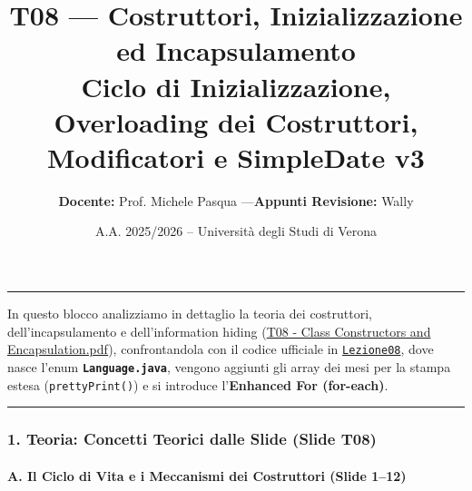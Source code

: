 \documentclass[11pt,a4paper]{article}
\title{\Huge\bfseries\sffamily\color{brandblue} T08 --- Costruttori, Inizializzazione ed Incapsulamento \\[0.3em] \large\sffamily Ciclo di Inizializzazione, Overloading dei Costruttori, Modificatori e SimpleDate v3}
\author{\textbf{Docente:} Prof. Michele Pasqua \quad---\quad \textbf{Appunti Revisione:} Wally}
\date{A.A. 2025/2026 -- Universit\`a degli Studi di Verona}
\newcommand{\passthrough}[1]{#1}
\begin{document}
\maketitle
\thispagestyle{fancy}
\vspace{-1.2em}
\noindent\textcolor{brandblue}{\rule{\textwidth}{0.8pt}}
\vspace{1.2em}

In questo blocco analizziamo in dettaglio la teoria dei costruttori,
dell'incapsulamento e dell'information hiding
(\href{file:///home/wally/Documenti/GitHub/Programmazione-II/25-26/Teoria-e-Esercitazioni/Slides-20260902/T08\%20-\%20Class\%20Constructors\%20and\%20Encapsulation.pdf}{T08
- Class Constructors and Encapsulation.pdf}), confrontandola con il
codice ufficiale in
\href{file:///home/wally/Documenti/GitHub/Programmazione-II/25-26/Teoria-e-Esercitazioni/Codice-20260902/Lezione08/SimpleDate/src}{\passthrough{\lstinline!Lezione08!}},
dove nasce l'enum \textbf{\passthrough{\lstinline!Language.java!}},
vengono aggiunti gli array dei mesi per la stampa estesa
(\passthrough{\lstinline!prettyPrint()!}) e si introduce
l'\textbf{Enhanced For (for-each)}.

\begin{center}\rule{0.5\linewidth}{0.5pt}\end{center}

\subsubsection{1. Teoria: Concetti Teorici dalle Slide (Slide
T08)}\label{teoria-concetti-teorici-dalle-slide-slide-t08}

\paragraph{A. Il Ciclo di Vita e i Meccanismi dei Costruttori (Slide
1--12)}\label{a.-il-ciclo-di-vita-e-i-meccanismi-dei-costruttori-slide-112}
\end{document}
